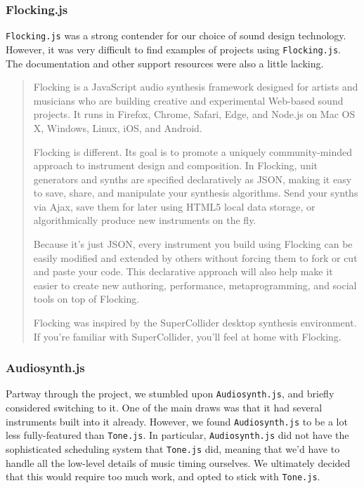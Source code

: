 \documentclass[12pt,a4paper]{article}
\newcommand{\lightcode}[1]{\colorbox{light-gray}{\texttt{#1}}}
\begin{document}
\subsubsection{Flocking.js}
\lightcode{Flocking.js} was a strong contender for our choice of sound design technology. However, it was very difficult to find examples of projects using \lightcode{Flocking.js}. The documentation and other support resources were also a little lacking.

\begin{quote}
Flocking is a JavaScript audio synthesis framework designed for artists and musicians who are building creative and experimental Web-based sound projects. It runs in Firefox, Chrome, Safari, Edge, and Node.js on Mac OS X, Windows, Linux, iOS, and Android.

Flocking is different. Its goal is to promote a uniquely community-minded approach to instrument design and composition. In Flocking, unit generators and synths are specified declaratively as JSON, making it easy to save, share, and manipulate your synthesis algorithms. Send your synths via Ajax, save them for later using HTML5 local data storage, or algorithmically produce new instruments on the fly.

Because it's just JSON, every instrument you build using Flocking can be easily modified and extended by others without forcing them to fork or cut and paste your code. This declarative approach will also help make it easier to create new authoring, performance, metaprogramming, and social tools on top of Flocking.

Flocking was inspired by the SuperCollider desktop synthesis environment. If you're familiar with SuperCollider, you'll feel at home with Flocking. \cite{flocking}
\end{quote}

\subsubsection{Audiosynth.js}

Partway through the project, we stumbled upon \lightcode{Audiosynth.js}, and briefly considered switching to it. One of the main draws was that it had several instruments built into it already. However, we found \lightcode{Audiosynth.js} to be a lot less fully-featured than \lightcode{Tone.js}. In particular, \lightcode{Audiosynth.js} did not have the sophisticated scheduling system that \lightcode{Tone.js} did, meaning that we'd have to handle all the low-level details of music timing ourselves. We ultimately decided that this would require too much work, and opted to stick with \lightcode{Tone.js}.
\end{document}
